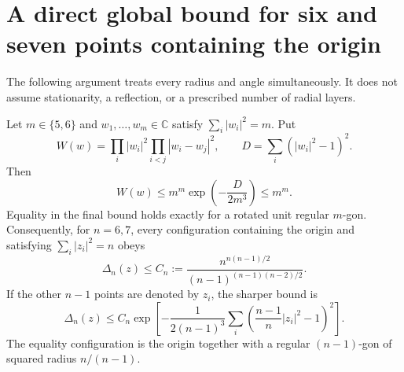 \section{A direct global bound for six and seven points containing the origin}
\label{sec:noclass-origin67}

The following argument treats every radius and angle simultaneously.
It does not assume stationarity, a reflection, or a prescribed number
of radial layers.

\begin{theorem}\label{thm:noclass-origin67}
Let $m\in\{5,6\}$ and $w_1,\ldots,w_m\in\mathbb C$ satisfy
$\sum_i|w_i|^2=m$. Put
\[
 W(w)=\prod_i|w_i|^2\prod_{i<j}|w_i-w_j|^2,\qquad
 D=\sum_i(|w_i|^2-1)^2.
\]
Then
\[
 W(w)\le m^m\exp\!\left(-\frac{D}{2m^3}\right)\le m^m.
\]
Equality in the final bound holds exactly for a rotated unit regular
$m$-gon. Consequently, for $n=6,7$, every configuration containing
the origin and satisfying $\sum_i|z_i|^2=n$ obeys
\[
 \Delta_n(z)\le
 C_n:=\frac{n^{n(n-1)/2}}{(n-1)^{(n-1)(n-2)/2}}.
\]
If the other $n-1$ points are denoted by $z_i$, the sharper bound is
\[
 \Delta_n(z)\le C_n\exp\!\left[
 -\frac{1}{2(n-1)^3}
 \sum_i\left(\frac{n-1}{n}|z_i|^2-1\right)^2\right].
\]
The equality configuration is the origin together with a regular
$(n-1)$-gon of squared radius $n/(n-1)$.
\end{theorem}

